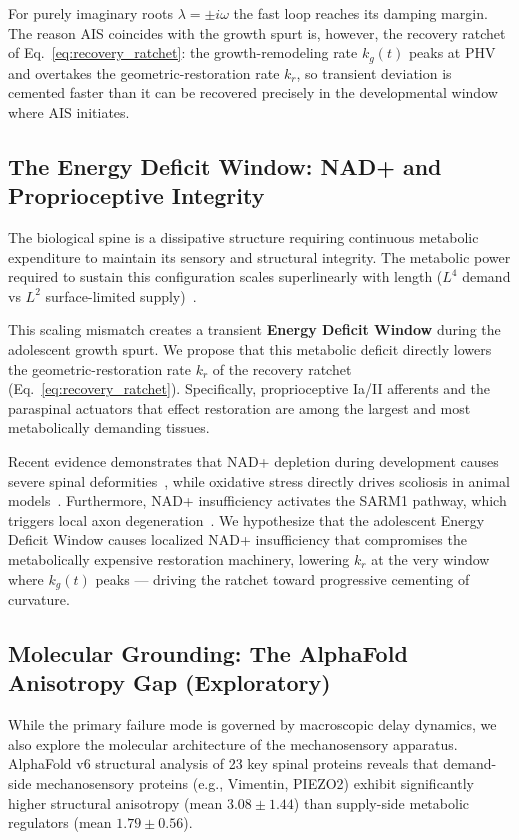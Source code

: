 For purely imaginary roots $\lambda = \pm i\omega$ the fast loop reaches its damping margin. The reason AIS coincides with the growth spurt is, however, the recovery ratchet of Eq.~\ref{eq:recovery_ratchet}: the growth-remodeling rate $k_g(t)$ peaks at PHV and overtakes the geometric-restoration rate $k_r$, so transient deviation is cemented faster than it can be recovered precisely in the developmental window where AIS initiates.

\subsection{The Energy Deficit Window: NAD+ and Proprioceptive Integrity}

The biological spine is a dissipative structure requiring continuous metabolic expenditure to maintain its sensory and structural integrity. The metabolic power required to sustain this configuration scales superlinearly with length ($L^4$ demand vs $L^2$ surface-limited supply)~\cite{urban2004nutrition}.

This scaling mismatch creates a transient \textbf{Energy Deficit Window} during the adolescent growth spurt. We propose that this metabolic deficit directly lowers the geometric-restoration rate $k_r$ of the recovery ratchet (Eq.~\ref{eq:recovery_ratchet}). Specifically, proprioceptive Ia/II afferents and the paraspinal actuators that effect restoration are among the largest and most metabolically demanding tissues.

Recent evidence demonstrates that NAD+ depletion during development causes severe spinal deformities~\cite{basse2021nampt}, while oxidative stress directly drives scoliosis in animal models~\cite{pumputis2025oxidative}. Furthermore, NAD+ insufficiency activates the SARM1 pathway, which triggers local axon degeneration~\cite{gerdts2015sarm1}. We hypothesize that the adolescent Energy Deficit Window causes localized NAD+ insufficiency that compromises the metabolically expensive restoration machinery, lowering $k_r$ at the very window where $k_g(t)$ peaks --- driving the ratchet toward progressive cementing of curvature.

\subsection{Molecular Grounding: The AlphaFold Anisotropy Gap (Exploratory)}

While the primary failure mode is governed by macroscopic delay dynamics, we also explore the molecular architecture of the mechanosensory apparatus. AlphaFold v6 structural analysis of 23 key spinal proteins reveals that demand-side mechanosensory proteins (e.g., Vimentin, PIEZO2) exhibit significantly higher structural anisotropy (mean $3.08 \pm 1.44$) than supply-side metabolic regulators (mean $1.79 \pm 0.56$).


